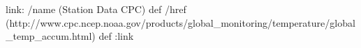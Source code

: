 
\begin{ingrid}
link:
/name (Station Data CPC) def
/href (http://www.cpc.ncep.noaa.gov/products/global_monitoring/temperature/global_temp_accum.html) def
:link

\end{ingrid}